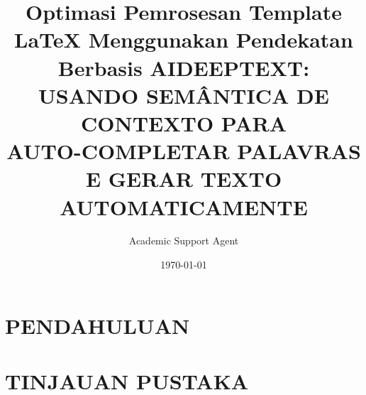 \documentclass{ufgtexposter}
\title{Optimasi Pemrosesan Template LaTeX Menggunakan Pendekatan Berbasis AI}
\author{Academic Support Agent}
\date{\today}
\begin{document}
\maketitle

\begin{abstract}

\end{abstract}

\chapter{PENDAHULUAN}


\chapter{TINJAUAN PUSTAKA}



\usepackage{lipsum}
\usepackage{natbib}
\usepackage{booktabs}
\usepackage{subfig} 
\usepackage{amsmath} 
\usepackage{textcomp} 
\usepackage{url}  
\usepackage[hidelinks]{hyperref}
\usepackage[utf8]{inputenc}
\usepackage[portuguese]{babel}



\setcolumnseprule{0pt}



\settitlesize{64pt}{68pt}

\setcontentfontesize{32pt}{40pt}

\setemailfontesize{42pt}{40pt}

\title{\uppercase{DeepText: usando semântica de contexto para\\
auto-completar palavras e gerar texto automaticamente}} 
\end{document}
